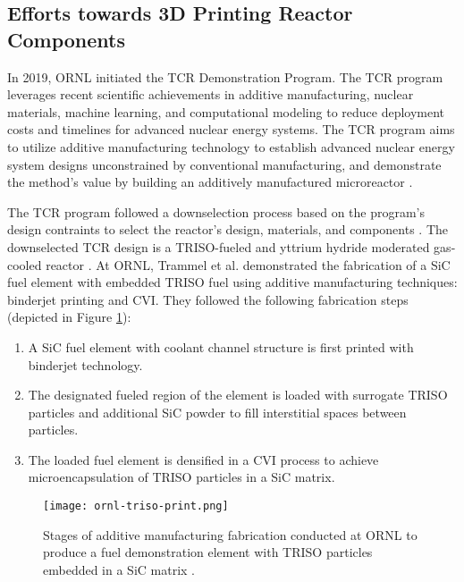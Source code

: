 \subsection{Efforts towards 3D Printing Reactor Components}
In 2019, \gls{ORNL} initiated the \gls{TCR} Demonstration Program.
The \gls{TCR} program leverages recent scientific achievements in additive 
manufacturing, nuclear materials, machine learning, and computational modeling
to reduce deployment costs and timelines for advanced nuclear energy systems. 
The \gls{TCR} program aims to utilize additive manufacturing technology to 
establish advanced nuclear energy system designs unconstrained by conventional 
manufacturing, and demonstrate the method's value by building an additively 
manufactured microreactor \cite{terrani_transformational_2019}. 

The \gls{TCR} program followed a downselection process based on the program's 
design contraints to select the reactor's design, materials, and components
\cite{betzler_transformational_2020}.
The downselected TCR design is a TRISO-fueled and yttrium hydride moderated 
gas-cooled reactor \cite{betzler_transformational_2020}.
At \gls{ORNL}, Trammel et al. \cite{trammell_advanced_2019} demonstrated 
the fabrication of a SiC fuel element with embedded \gls{TRISO} fuel using 
additive manufacturing techniques: binderjet printing and \gls{CVI}. 
They followed the following fabrication steps (depicted in Figure 
\ref{fig:ornl-triso-print}): 
\begin{enumerate}
    \item A SiC fuel element with coolant channel structure is first printed with 
    binderjet technology. 
    \item The designated fueled region of the element is loaded with surrogate 
    \gls{TRISO} particles and additional SiC powder to fill interstitial spaces
    between particles. 
    \item The loaded fuel element is densified in a \gls{CVI} process to achieve 
    microencapsulation of \gls{TRISO} particles in a SiC matrix. 
\end{enumerate}
\begin{figure}[btp]
    \centering
    \texttt{[image: ornl-triso-print.png]} 
    \caption{Stages of additive manufacturing fabrication conducted at \acrlong{ORNL} to 
    produce a fuel demonstration element with \gls{TRISO} particles embedded in 
    a SiC matrix \cite{trammell_advanced_2019}.}
    \label{fig:ornl-triso-print}
\end{figure}
